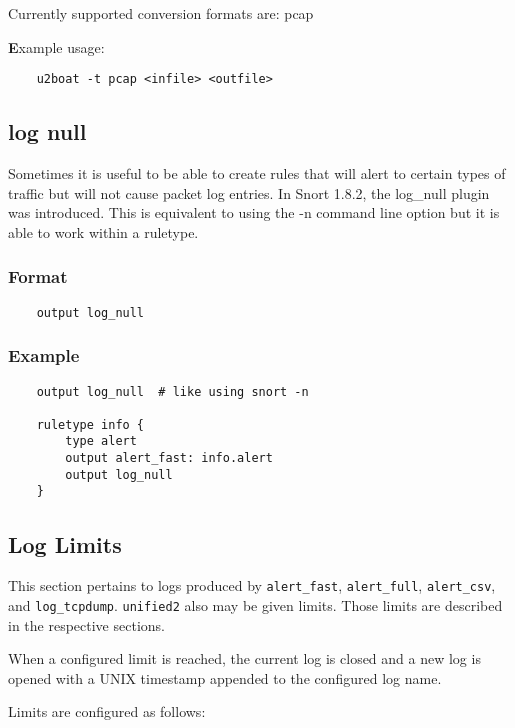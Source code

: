 \documentclass[english]{report}
\begin{document}
Currently supported conversion formats are: pcap

\textbf Example usage:
\begin{verbatim}
    u2boat -t pcap <infile> <outfile>
\end{verbatim}

\subsection{log null}

Sometimes it is useful to be able to create rules that will alert to certain
types of traffic but will not cause packet log entries.  In Snort 1.8.2, the
log\_null plugin was introduced. This is equivalent to using the -n command
line option but it is able to work within a ruletype.

\subsubsection{Format}

\begin{verbatim}
    output log_null
\end{verbatim}

\subsubsection{Example}

\begin{verbatim}
    output log_null  # like using snort -n
    
    ruletype info {
        type alert
        output alert_fast: info.alert
        output log_null
    }
\end{verbatim}

\subsection{Log Limits}
\label{Log Limits}

This section pertains to logs produced by \texttt{alert\_fast},
\texttt{alert\_full}, \texttt{alert\_csv}, and \texttt{log\_tcpdump}.
\texttt{unified2} also may be given limits.  Those limits
are described in the respective sections.

When a configured limit is reached, the current log is closed and a new log is
opened with a UNIX timestamp appended to the configured log name.

Limits are configured as follows:
\end{document}
